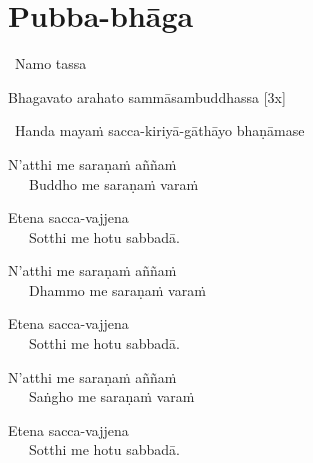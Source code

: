 
\section{Pubba-bhāga}
\label{pubba-bhaga}


\begin{intro}
	\anglebracketleft\ \hspace{-0.5mm}Namo tassa \hspace{-0.5mm}\anglebracketright\
\end{intro}

Bhagavato arahato sammāsambuddhassa \hfill{[3x]}

\bigskip

\begin{center}
	\anglebracketleft\ \hspace{-0.5mm}Handa mayaṁ sacca-kiriyā-gāthāyo bhaṇāmase \hspace{-0.5mm}\anglebracketright\
\end{center}


\begin{hanging-indent}
N'atthi me saraṇaṁ aññaṁ\\
Buddho me saraṇaṁ varaṁ
\end{hanging-indent}
\begin{hanging-indent}
Etena sacca-vajjena\\
Sotthi me hotu sabbadā.
\end{hanging-indent}

\begin{hanging-indent}
N'atthi me saraṇaṁ aññaṁ\\
Dhammo me saraṇaṁ varaṁ
\end{hanging-indent}
\begin{hanging-indent}
Etena sacca-vajjena\\
Sotthi me hotu sabbadā.
\end{hanging-indent}

\begin{hanging-indent}
N'atthi me saraṇaṁ aññaṁ\\
Saṅgho me saraṇaṁ varaṁ
\end{hanging-indent}
\begin{hanging-indent}
Etena sacca-vajjena\\
Sotthi me hotu sabbadā.
\end{hanging-indent}

